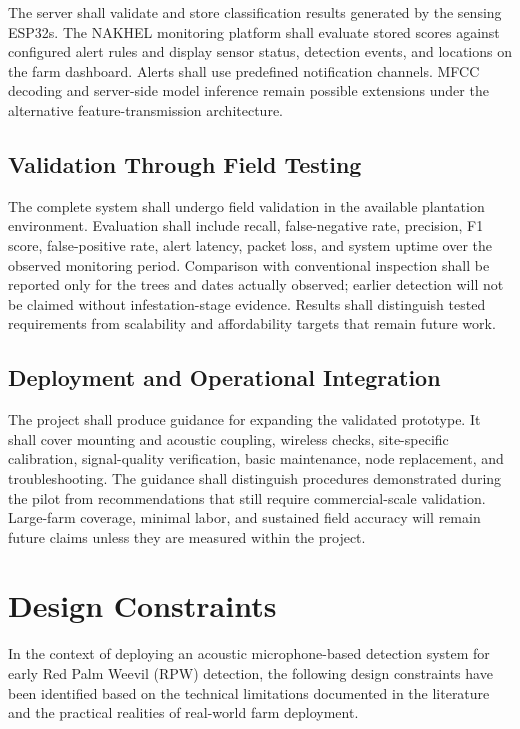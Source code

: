 \documentclass[12pt,a4paper,oneside]{memoir}
\newcommand{\earlierrevision}[1]{#1}
\newcommand{\newrevision}[1]{#1}
\begin{document}
\newrevision{The server shall validate and store classification results generated by the sensing ESP32s. The NAKHEL monitoring platform shall evaluate stored scores against configured alert rules and display sensor status, detection events, and locations on the farm dashboard. Alerts shall use predefined notification channels. MFCC decoding and server-side model inference remain possible extensions under the alternative feature-transmission architecture.}
 
\subsection{Validation Through Field Testing}
 
\earlierrevision{The complete system shall undergo field validation in the available plantation environment. Evaluation shall include recall, false-negative rate, precision, F1 score, false-positive rate, alert latency, packet loss, and system uptime over the observed monitoring period. Comparison with conventional inspection shall be reported only for the trees and dates actually observed; earlier detection will not be claimed without infestation-stage evidence. Results shall distinguish tested requirements from scalability and affordability targets that remain future work.}
 

\subsection{Deployment and Operational Integration}
 
\earlierrevision{The project shall produce guidance for expanding the validated prototype. It shall cover mounting and acoustic coupling, wireless checks, site-specific calibration, signal-quality verification, basic maintenance, node replacement, and troubleshooting. The guidance shall distinguish procedures demonstrated during the pilot from recommendations that still require commercial-scale validation. Large-farm coverage, minimal labor, and sustained field accuracy will remain future claims unless they are measured within the project.}
 
\section{Design Constraints}
\label{sec:Constraints}
 
In the context of deploying an acoustic microphone-based detection system for early Red Palm Weevil (RPW) detection, the following design constraints have been identified based on the technical limitations documented in the literature and the practical realities of real-world farm deployment.
 
\end{document}
